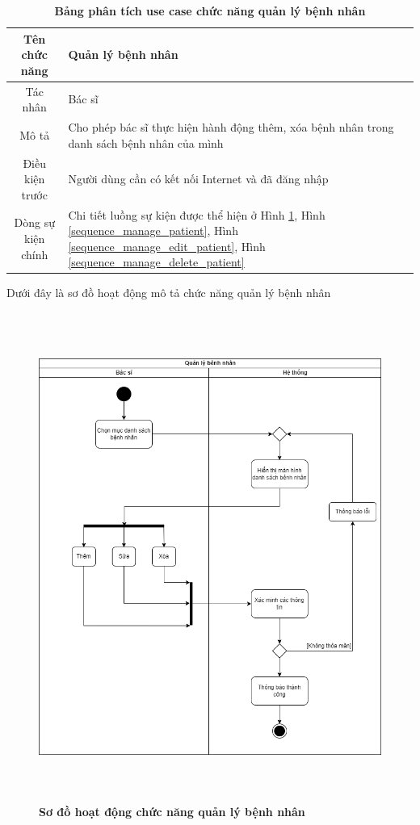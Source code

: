   \begin{table}[H]
    \caption{\bfseries \fontsize{12pt}{0pt}\selectfont Bảng phân tích use case chức năng quản lý bệnh nhân}
    \centering
    \begin{tabularx}{0.9\textwidth}{|c|X|}
      \hline
      \textbf{Tên chức năng} & \textbf{Quản lý bệnh nhân} \\
      \hline
      Tác nhân & Bác sĩ \\
      \hline
      Mô tả & Cho phép bác sĩ thực hiện hành động thêm, xóa bệnh nhân trong danh sách bệnh nhân của mình \\
      \hline
      Điều kiện trước & Người dùng cần có kết nối Internet và đã đăng nhập \\
      \hline
      Dòng sự kiện chính & 
        Chi tiết luồng sự kiện được thể hiện ở Hình \ref{activity_patient_management}, Hình \ref{sequence_manage_patient},
        Hình \ref{sequence_manage_edit_patient}, Hình \ref{sequence_manage_delete_patient}
        \\
      \hline
    \end{tabularx}
  \end{table}
  Dưới đây là sơ đồ hoạt động mô tả chức năng quản lý bệnh nhân
  \begin{figure}[H]
    \centering
    \includegraphics[width=13.5cm,height=16cm]{Images/acitivity/activity_manage_patient.png}
    \caption[Sơ đồ hoạt động chức năng quản lý bệnh nhân]{\bfseries \fontsize{12pt}{0pt}
    \selectfont Sơ đồ hoạt động chức năng quản lý bệnh nhân}
    \label{activity_patient_management} %
  \end{figure}

